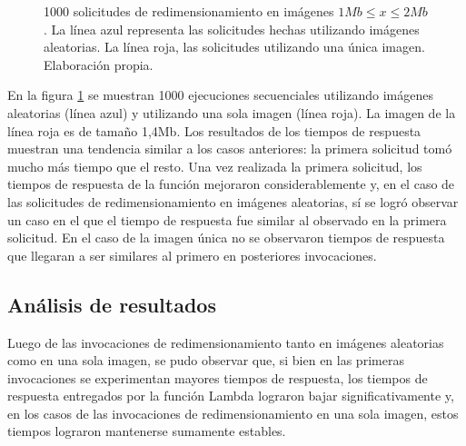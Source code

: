 \begin{figure}[h]
\hspace{-1.5cm}
\caption[\hspace{0.2cm} 1000 solicitudes de redimensionamiento en imágenes $1Mb \leq x \leq 2Mb$]{1000 solicitudes de redimensionamiento en imágenes $1Mb \leq x \leq 2Mb$. La línea azul representa las solicitudes hechas utilizando imágenes aleatorias. La línea roja, las solicitudes utilizando una única imagen. Elaboración propia.}
\label{fig:1000-ejecuciones-secuenciales-2mb}
\end{figure}

En la figura \ref{fig:1000-ejecuciones-secuenciales-2mb} se muestran 1000 ejecuciones secuenciales utilizando imágenes aleatorias (línea azul) y utilizando una sola imagen (línea roja). La imagen de la línea roja es de tamaño 1,4Mb. Los resultados de los tiempos de respuesta muestran una tendencia similar a los casos anteriores: la primera solicitud tomó mucho más tiempo que el resto. Una vez realizada la primera solicitud, los tiempos de respuesta de la función mejoraron considerablemente y, en el caso de las solicitudes de redimensionamiento en imágenes aleatorias, sí se logró observar un caso en el que el tiempo de respuesta fue similar al observado en la primera solicitud. En el caso de la imagen única no se observaron tiempos de respuesta que llegaran a ser similares al primero en posteriores invocaciones. 

\subsection{Análisis de resultados}\label{sec:experimento-2-resultados}
Luego de las invocaciones de redimensionamiento tanto en imágenes aleatorias como en una sola imagen, se pudo observar que, si bien en las primeras invocaciones se experimentan mayores tiempos de respuesta, los tiempos de respuesta entregados por la función Lambda lograron bajar significativamente y, en los casos de las invocaciones de redimensionamiento en una sola imagen, estos tiempos lograron mantenerse sumamente estables.

